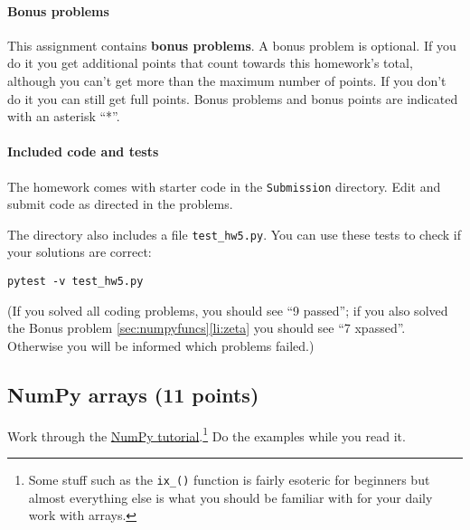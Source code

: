 \documentclass[letterpaper]{scrartcl}
\begin{document}
\paragraph{Bonus problems}

This assignment contains \textbf{bonus problems}. A bonus problem is
optional. If you do it you get additional points that count towards
this homework's total, although you can't get more than the maximum
number of points. If you don't do it you can still get full
points. Bonus problems and bonus points are indicated with an asterisk
``*''.

\paragraph{Included code and tests}

The homework comes with starter code in the \texttt{Submission}
directory. Edit and submit code as directed in the problems.

The directory also includes a file \texttt{test\_hw5.py}. 
You can use these tests to check if your solutions are correct:
\begin{verbatim}
pytest -v test_hw5.py
\end{verbatim}
(If you solved all coding problems, you should see ``9 passed''; if
you also solved the Bonus problem \ref{sec:numpyfuncs}\ref{li:zeta}
you should see ``7 xpassed''. Otherwise you will be informed which
problems failed.)


\subsection{NumPy arrays (11 points)}

Work through the
\href{https://docs.scipy.org/doc/numpy/user/quickstart.html}{NumPy
  tutorial}.\footnote{Some stuff such as the \texttt{ix\_()} function
  is fairly esoteric for beginners but almost everything else is what
  you should be familiar with for your daily work with arrays.} Do
the examples while you read it.
\end{document}
